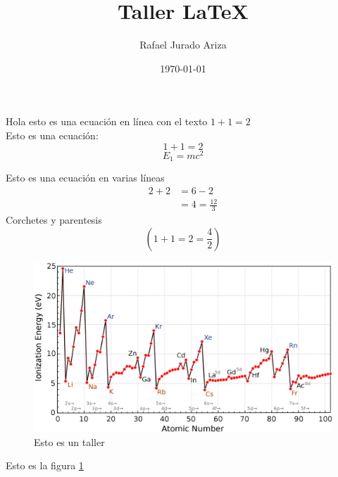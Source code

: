 \documentclass[a4paper]{article}
\title{\vspace{-1.5cm}Taller \LaTeX}
\author{Rafael Jurado Ariza}
\date{\today}
\begin{document}
    \maketitle
    Hola esto es una ecuación en línea con el texto $1+1=2$\\
    Esto es una ecuación:
    \begin{equation} 
        1+1=2
    \end{equation}
    \begin{equation*}
        E_1=mc^2 
    \end{equation*}
    
    Esto es una ecuación en varias líneas
    \begin{align*}
        2+2&=6-2\\
        &=4=\frac{12}{3}
    \end{align*}
    Corchetes  y parentesis 
    \begin{equation*}  
        \left(1+1=2=\frac{4}{2}\right) 
    \end{equation*}
    \begin{figure}[h!]
        \centering
        \includegraphics[scale=0.18]{pic/Ionization_energies.png}
        \caption{Esto es un taller}
        \label{fig:energy}
    \end{figure}
    \newpage 
    Esto es la figura \ref{fig:energy}
\end{document}
